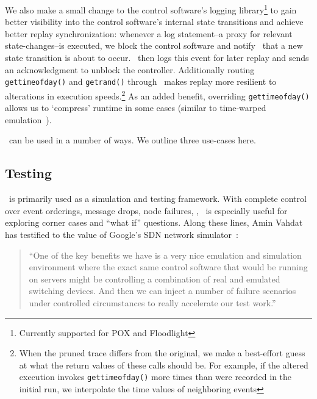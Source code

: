 We also make a
small change to the control software's logging library\footnote{Currently
supported for POX
and Floodlight} to gain better visibility into the control software's internal state
transitions and achieve better replay synchronization: whenever a log
statement--a proxy for relevant state-changes--is executed, we
block the control software and notify \projectname~that a new state transition
is about to occur. \projectname~then logs this event for later replay and
sends an acknowledgment to unblock the controller.
Additionally routing {\tt gettimeofday()} and {\tt getrand()} through
\projectname~makes replay more resilient to alterations in execution
speeds.\footnote{When the pruned trace differs from the original, we make a
best-effort guess at what the return values of these calls should be. For example,
if the altered execution invokes {\tt gettimeofday()} more times than were recorded
in the initial run, we interpolate the time values of neighboring events}
As an added benefit, overriding {\tt gettimeofday()} allows us to `compress'
runtime in some cases (similar to time-warped emulation~\cite{Gupta06toinfinity}).

\projectname~can be used in a number of ways. We outline three use-cases here.


\subsection{Testing}

\projectname~is primarily used as a simulation and testing framework.
With complete control over event orderings, message drops, node
failures, \etc, \projectname~is especially useful for exploring corner cases
and ``what if'' questions. Along these lines, Amin Vahdat
has testified to the value of Google's SDN network simulator~\cite{vadhat}:
\begin{quote}
``One of the key benefits we have is a very nice emulation and
simulation environment where the exact same control software that would be
running on servers might be controlling a combination of real and emulated
switching devices. And then we can inject a number of failure scenarios under
controlled circumstances to really accelerate our test work.''
\end{quote}

